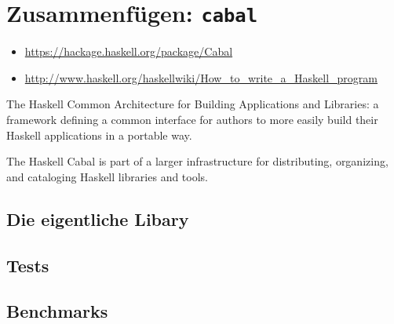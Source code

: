 \section{Zusammenfügen: \texttt{cabal}}
\begin{itemize}
  \item \url{https://hackage.haskell.org/package/Cabal}
  \item \url{http://www.haskell.org/haskellwiki/How_to_write_a_Haskell_program}
\end{itemize}
The Haskell Common Architecture for Building Applications and Libraries: a
framework defining a common interface for authors to more easily build their
Haskell applications in a portable way.

The Haskell Cabal is part of a larger infrastructure for distributing,
organizing, and cataloging Haskell libraries and tools.


%

\subsection{Die eigentliche Libary}
%

\subsection{Tests}
%

\subsection{Benchmarks}
%
